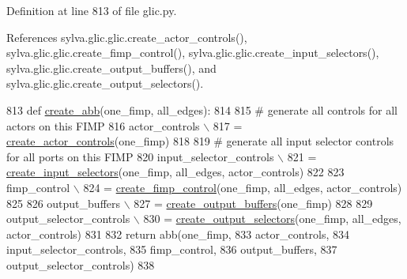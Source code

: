 Definition at line 813 of file glic.\+py.



References sylva.\+glic.\+glic.\+create\+\_\+actor\+\_\+controls(), sylva.\+glic.\+glic.\+create\+\_\+fimp\+\_\+control(), sylva.\+glic.\+glic.\+create\+\_\+input\+\_\+selectors(), sylva.\+glic.\+glic.\+create\+\_\+output\+\_\+buffers(), and sylva.\+glic.\+glic.\+create\+\_\+output\+\_\+selectors().


\begin{DoxyCode}
813   \textcolor{keyword}{def }\hyperlink{namespacesylva_1_1glic_1_1glic_a3a984424c11a0b4b6ac8890135ccbfe9}{create\_abb}(one\_fimp, all\_edges):
814 
815     \textcolor{comment}{# generate all controls for all actors on this FIMP}
816     actor\_controls \(\backslash\)
817         = \hyperlink{namespacesylva_1_1glic_1_1glic_a0b179ee41ee4494cf7450be4ca272db4}{create\_actor\_controls}(one\_fimp)
818 
819     \textcolor{comment}{# generate all input selector controls for all ports on this FIMP}
820     input\_selector\_controls \(\backslash\)
821         = \hyperlink{namespacesylva_1_1glic_1_1glic_a28f028a55874a8d890d0df58905da73b}{create\_input\_selectors}(one\_fimp, all\_edges, actor\_controls)
822 
823     fimp\_control \(\backslash\)
824         = \hyperlink{namespacesylva_1_1glic_1_1glic_a1cdd3394b53489429bc51c8206e1180e}{create\_fimp\_control}(one\_fimp, all\_edges, actor\_controls)
825 
826     output\_buffers \(\backslash\)
827         = \hyperlink{namespacesylva_1_1glic_1_1glic_a53c55762a3c7d476be7ee748baeccbeb}{create\_output\_buffers}(one\_fimp)
828 
829     output\_selector\_controls \(\backslash\)
830         = \hyperlink{namespacesylva_1_1glic_1_1glic_a7eb9347832747ffffb52851a1ee2d08f}{create\_output\_selectors}(one\_fimp, all\_edges, actor\_controls)
831 
832     \textcolor{keywordflow}{return} abb(one\_fimp,
833                actor\_controls,
834                input\_selector\_controls,
835                fimp\_control,
836                output\_buffers,
837                output\_selector\_controls)
838 \end{DoxyCode}
\mbox{\label{namespacesylva_1_1glic_1_1glic_ae31a233cafcb3a83bd369c491b133b91}} 
